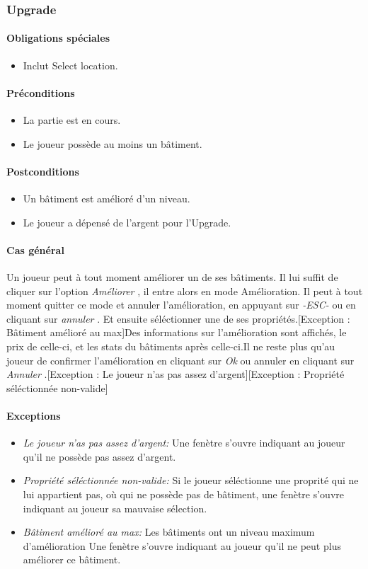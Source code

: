 \documentclass[a4paper,11pt]{report}
\begin{document}
\subsubsection{Upgrade}
\paragraph{Obligations spéciales}
\begin{itemize}
 \item Inclut Select location.
\end{itemize}
\paragraph{Préconditions}
\begin{itemize}
 \item La partie est en cours.
 \item Le joueur possède au moins un bâtiment.
\end{itemize}
\paragraph{Postconditions}
\begin{itemize}
 \item Un bâtiment est amélioré d'un niveau.
 \item Le joueur a dépensé de l'argent pour l'Upgrade.
\end{itemize}
\paragraph{Cas général}
Un joueur peut à tout moment améliorer un de ses bâtiments. Il lui suffit de cliquer sur l'option \og \textit{Améliorer} \fg, il entre alors en mode Amélioration. Il peut à tout moment quitter ce mode et annuler l'amélioration, en appuyant sur \og \textit{-ESC-} \fg ou en cliquant sur \og \textit{annuler} \fg. Et ensuite séléctionner une de ses propriétés.[Exception : Bâtiment amélioré au max]Des informations sur l'amélioration sont affichés, le prix de celle-ci, et les stats du bâtiments après celle-ci.Il ne reste plus qu'au joueur de confirmer l'amélioration en cliquant sur \og \textit{Ok} \fg ou annuler en cliquant sur \og \textit{Annuler} \fg.[Exception : Le joueur n'as pas assez d'argent][Exception : Propriété séléctionnée non-valide]
\paragraph{Exceptions}
\begin{itemize}
 \item \textit{Le joueur n'as pas assez d'argent:}  Une fenètre s'ouvre indiquant au joueur qu'il ne possède pas assez d'argent.
 \item \textit{Propriété séléctionnée non-valide:}  Si le joueur séléctionne une proprité qui ne lui appartient pas, où qui ne possède pas de bâtiment, une fenètre s'ouvre indiquant au joueur sa mauvaise sélection.
 \item \textit{Bâtiment amélioré au max:}  Les bâtiments ont un niveau maximum d'amélioration Une fenètre s'ouvre indiquant au joueur qu'il ne peut plus améliorer ce bâtiment.
\end{itemize}
\end{document}
